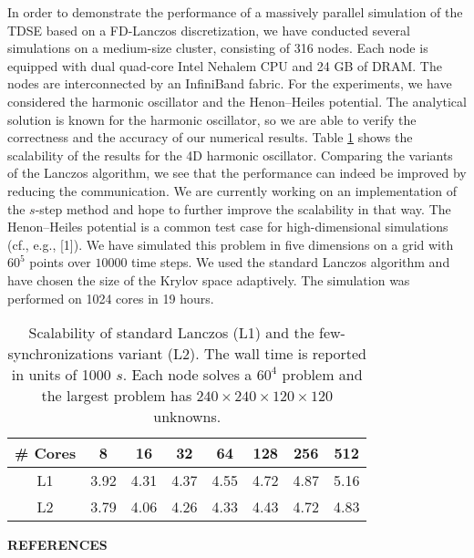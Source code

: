 \documentclass{report}
\begin{document}
In order to demonstrate the performance of a massively parallel
simulation of the TDSE based on a FD-Lanczos discretization, we have
conducted several simulations on a medium-size cluster, consisting of 316
nodes. Each node is equipped with dual quad-core Intel Nehalem CPU and 24
GB of DRAM. The nodes are interconnected by an InfiniBand fabric. For the
experiments, we have considered the harmonic oscillator and the
Henon--Heiles potential. The analytical solution is known for the
harmonic oscillator, so we are able to verify the correctness and the
accuracy of our numerical results. Table \ref{tab:1} shows the
scalability of the results for the 4D harmonic oscillator. Comparing the
variants of the Lanczos algorithm, we see that the performance can indeed
be improved by reducing the communication. We are currently working on an
implementation of the $s$-step method and hope to further improve the
scalability in that way. The Henon--Heiles potential is a common test
case for high-dimensional simulations (cf., e.g., [1]). We have simulated
this problem in five dimensions on a grid with $60^5$ points over $10000$
time steps. We used the standard Lanczos algorithm and have chosen the
size of the Krylov space adaptively. The simulation was performed on 1024
cores in 19 hours.

\hspace{-7mm}
\begin{table}[htdp]
\caption{\footnotesize{Scalability of standard Lanczos (L1) and the
few-synchronizations variant (L2). The wall time is reported in units of
1000 $s$. Each node solves a $60^{4}$ problem and the largest problem has
$240 \times 240 \times 120 \times 120$ unknowns.}}
\begin{center}
\begin{tabular}{|c|c|c|c|c|c|c|c|}
\hline
\# Cores & 8 & 16 & 32 & 64 & 128 & 256 & 512 \\
\hline
L1& 3.92& 4.31& 4.37& 4.55& 4.72& 4.87& 5.16 \\
L2& 3.79& 4.06& 4.26& 4.33& 4.43& 4.72& 4.83 \\
\hline
\end{tabular}
\end{center}
\label{tab:1}
\end{table}%


\begin{center}
{\bf REFERENCES}\\[-3mm]
\end{center}
\end{document}
